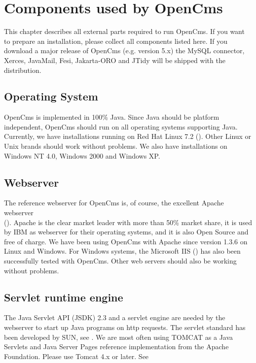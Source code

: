 \chapter{Components used by OpenCms}
\label{components}

This chapter describes all external parts required to run OpenCms.
If you want to prepare an installation, please collect all
components listed here. If you download a major release of OpenCms
(e.g. version 5.x) the MySQL connector, Xerces, JavaMail, Fesi, 
Jakarta-ORO and JTidy will be shipped with the distribution.

\section{Operating System}
OpenCms is implemented in 100\% Java. Since Java should be platform independent, OpenCms should run
on all operating systems supporting Java. Currently, we have installations running on
Red Hat Linux 7.2 (). Other
Linux or Unix brands should work without problems. We also have installations on
Windows NT 4.0, Windows 2000 and Windows XP.

\section{Webserver}
The reference webserver for OpenCms is, of course, the excellent Apache webserver \\
().
Apache is the clear market leader with more than 50\% market share,
it is used by IBM as webserver for their operating systems, and it is also Open Source and
free of charge. We have been using OpenCms with Apache since version 1.3.6 on Linux and Windows.
For Windows systems, the Microsoft IIS ()
has also been successfully tested with OpenCms. 
Other web servers should also be working without problems.

\section{Servlet runtime engine}
The Java Servlet API (JSDK) 2.3 and a servlet engine are needed by
the webserver to start up Java programs on http requests. The
servlet standard has been developed by SUN, see
.
We are most often using TOMCAT as a Java Servlets and Java Server
Pages reference implementation from the Apache Foundation. Please use
Tomcat 4.x or later. See

